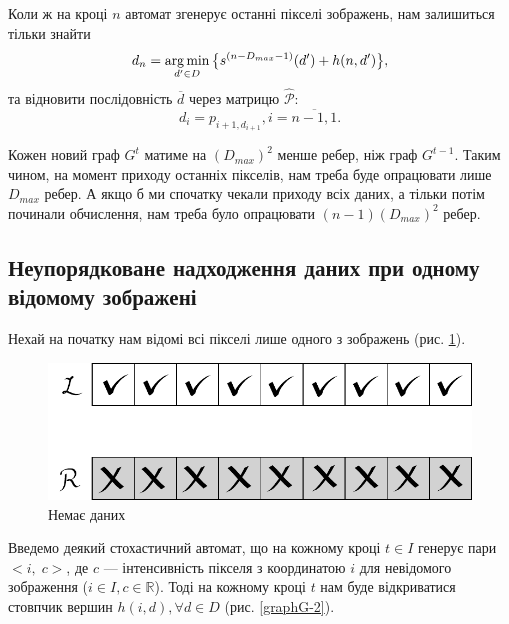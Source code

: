 Коли ж на кроці $ n $ автомат згенерує останні пікселі зображень, нам залишиться тільки знайти
$$ d_n = \operatorname*{arg\,min}\limits_{d' \in D} \big\{ { s^{(n-D_{max}-1)}(d') + h(n, d') } \big\},$$
та відновити послідовність $\overline{d}$ через матрицю $\hat{\mathcal{P}}$:
$$ d_i = p_{i+1,d_{i+1}}, i = \overline{n-1, 1}. $$

Кожен новий граф $G^t$ матиме на $(D_{max})^2$ менше ребер, ніж граф $G^{t-1}$. Таким чином, на момент приходу останніх пікселів, нам треба буде опрацювати лише $D_{max}$ ребер. А якщо б ми спочатку чекали приходу всіх даних, а тільки потім починали обчислення, нам треба було опрацювати 
$(n-1)(D_{max})^2$ ребер.

\subsection{Неупорядковане надходження даних при одному відомому зображені}
Нехай на початку нам відомі всі пікселі лише одного з зображень (рис. \ref{1.3nodata}).
\begin{figure}[h!]
	\centering
	\includegraphics[scale = 0.8]{allclosed.pdf}
	\caption{Немає даних}
	\label{1.3nodata}
\end{figure}
Введемо деякий стохастичний автомат, що на кожному кроці $ t \in I $ генерує пари $<i, \;c>$, де $ c $ --- інтенсивність пікселя з координатою $ i $ для невідомого зображення ($ i \in I, c \in \mathbb{R} $).
Тоді на кожному кроці $ t $ нам буде відкриватися стовпчик вершин $  h(i, d), \forall d \in D $ (рис. \ref{graphG-2}).
